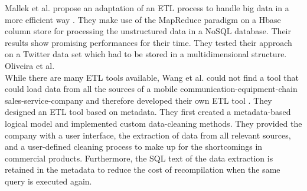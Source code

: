 \documentclass[11pt]{article}
\begin{document}
Mallek et al. propose an adaptation of an ETL process to handle big data in a more efficient way \cite{Mallek2018798}. They make use of the MapReduce paradigm on a Hbase column store for processing the unstructured data in a NoSQL database. Their results show promising performances for their time. They tested their approach on a Twitter data set which had to be stored in a multidimensional structure. Oliveira et al. \\

While there are many ETL tools available, Wang et al. could not find a tool that could load data from all the sources of a mobile communication-equipment-chain sales-service-company and therefore developed their own ETL tool \cite{Wang2020}. They designed an ETL tool based on metadata. They first created a metadata-based logical model and implemented custom data-cleaning methods. They provided the company with a user interface, the extraction of data from all relevant sources, and a user-defined cleaning process to make up for the shortcomings in commercial products. Furthermore, the SQL text of the data extraction is retained in the metadata to reduce the cost of recompilation when the same query is executed again.\\
\end{document}
